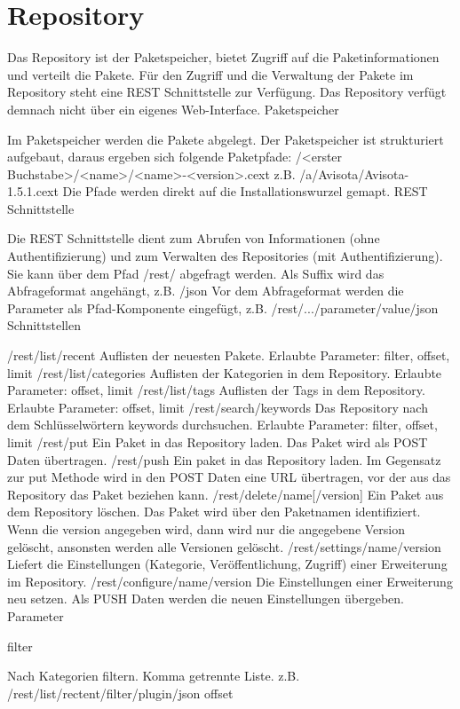 \chapter{Repository}

Das Repository ist der Paketspeicher, bietet Zugriff auf die Paketinformationen und verteilt die Pakete. Für den Zugriff und die Verwaltung der Pakete im Repository steht eine REST Schnittstelle zur Verfügung. Das Repository verfügt demnach nicht über ein eigenes Web-Interface.
Paketspeicher

Im Paketspeicher werden die Pakete abgelegt. Der Paketspeicher ist strukturiert aufgebaut, daraus ergeben sich folgende Paketpfade:
/<erster Buchstabe>/<name>/<name>-<version>.cext
z.B.
/a/Avisota/Avisota-1.5.1.cext
Die Pfade werden direkt auf die Installationswurzel gemapt.
REST Schnittstelle

Die REST Schnittstelle dient zum Abrufen von Informationen (ohne Authentifizierung) und zum Verwalten des Repositories (mit Authentifizierung).
Sie kann über dem Pfad /rest/ abgefragt werden.
Als Suffix wird das Abfrageformat angehängt, z.B. /json
Vor dem Abfrageformat werden die Parameter als Pfad-Komponente eingefügt, z.B. /rest/.../parameter/value/json
Schnittstellen

/rest/list/recent
Auflisten der neuesten Pakete.
Erlaubte Parameter: filter, offset, limit
/rest/list/categories
Auflisten der Kategorien in dem Repository.
Erlaubte Parameter: offset, limit
/rest/list/tags
Auflisten der Tags in dem Repository.
Erlaubte Parameter: offset, limit
/rest/search/keywords
Das Repository nach dem Schlüsselwörtern keywords durchsuchen.
Erlaubte Parameter: filter, offset, limit
/rest/put
Ein Paket in das Repository laden. Das Paket wird als POST Daten übertragen.
/rest/push
Ein paket in das Repository laden. Im Gegensatz zur put Methode wird in den POST Daten eine URL übertragen, vor der aus das Repository das Paket beziehen kann.
/rest/delete/name[/version]
Ein Paket aus dem Repository löschen. Das Paket wird über den Paketnamen identifiziert. Wenn die version angegeben wird, dann wird nur die angegebene Version gelöscht, ansonsten werden alle Versionen gelöscht.
/rest/settings/name/version
Liefert die Einstellungen (Kategorie, Veröffentlichung, Zugriff) einer Erweiterung im Repository.
/rest/configure/name/version
Die Einstellungen einer Erweiterung neu setzen. Als PUSH Daten werden die neuen Einstellungen übergeben.
Parameter

filter

Nach Kategorien filtern. Komma getrennte Liste.
z.B. /rest/list/rectent/filter/plugin/json
offset

